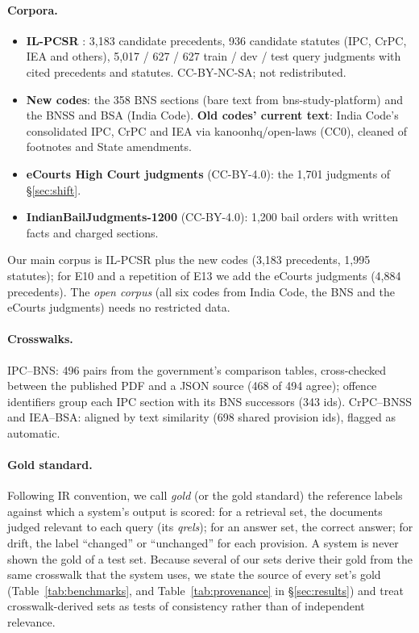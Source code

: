\documentclass[sigconf,nonacm]{acmart}
\begin{document}
\paragraph{Corpora.}
\begin{itemize}
\item \textbf{IL-PCSR} \cite{ilpcsr}: 3,183 candidate precedents, 936 candidate statutes (IPC,
CrPC, IEA and others), 5,017 / 627 / 627 train / dev / test query judgments with cited precedents
and statutes. CC-BY-NC-SA; not redistributed.
\item \textbf{New codes}: the 358 BNS sections (bare text from bns-study-platform) and the BNSS and
BSA (India Code). \textbf{Old codes' current text}: India Code's consolidated IPC, CrPC and IEA via
kanoonhq/open-laws (CC0), cleaned of footnotes and State amendments.
\item \textbf{eCourts High Court judgments} (CC-BY-4.0): the 1,701 judgments of \S\ref{sec:shift}.
\item \textbf{IndianBailJudgments-1200} \cite{bail1200} (CC-BY-4.0): 1,200 bail orders with
written facts and charged sections.
\end{itemize}
Our main corpus is IL-PCSR plus the new codes (3,183 precedents, 1,995 statutes); for E10 and a
repetition of E13 we add the eCourts judgments (4,884 precedents). The \emph{open corpus} (all six
codes from India Code, the BNS and the eCourts judgments) needs no restricted data.

\paragraph{Crosswalks.} IPC--BNS: 496 pairs from the government's comparison tables, cross-checked
between the published PDF and a JSON source (468 of 494 agree); offence identifiers group each IPC
section with its BNS successors (343 ids). CrPC--BNSS and IEA--BSA: aligned by text similarity
(698 shared provision ids), flagged as automatic.

\paragraph{Gold standard.} Following IR convention, we call \emph{gold} (or the gold standard) the
reference labels against which a system's output is scored: for a retrieval set, the documents
judged relevant to each query (its \emph{qrels}); for an answer set, the correct answer; for drift,
the label ``changed'' or ``unchanged'' for each provision. A system is never shown the gold of a
test set. Because several of our sets derive their gold from the same crosswalk that the system
uses, we state the source of every set's gold (Table~\ref{tab:benchmarks}, and
Table~\ref{tab:provenance} in \S\ref{sec:results}) and treat crosswalk-derived sets as tests of
consistency rather than of independent relevance.
\end{document}
